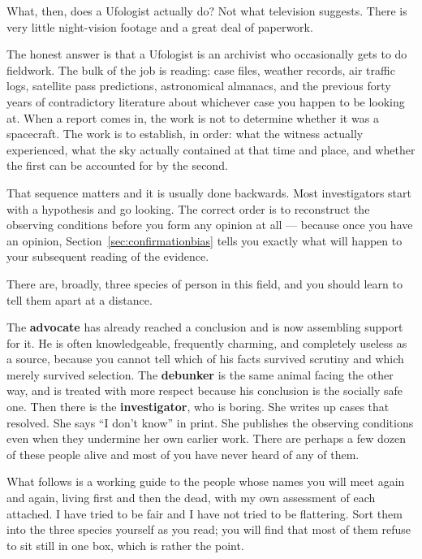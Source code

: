 What, then, does a Ufologist actually do? Not what television suggests. There is very
little night-vision footage and a great deal of paperwork.

The honest answer is that a Ufologist is an archivist who occasionally gets to do
fieldwork. The bulk of the job is reading: case files, weather records, air traffic
logs, satellite pass predictions, astronomical almanacs, and the previous forty years of
contradictory literature about whichever case you happen to be looking at. When a report
comes in, the work is not to determine whether it was a spacecraft. The work is to
establish, in order: what the witness actually experienced, what the sky actually
contained at that time and place, and whether the first can be accounted for by the
second.

That sequence matters and it is usually done backwards. Most investigators start with a
hypothesis and go looking. The correct order is to reconstruct the observing conditions
before you form any opinion at all --- because once you have an opinion, Section~\ref{sec:confirmationbias}
tells you exactly what will happen to your subsequent reading of the evidence.

There are, broadly, three species of person in this field, and you should learn to tell
them apart at a distance.

The \textbf{advocate} has already reached a conclusion and is now assembling support for
it. He is often knowledgeable, frequently charming, and completely useless as a source,
because you cannot tell which of his facts survived scrutiny and which merely survived
selection. The \textbf{debunker} is the same animal facing the other way, and is treated
with more respect because his conclusion is the socially safe one. Then there is the
\textbf{investigator}, who is boring. She writes up cases that resolved. She says ``I
don't know'' in print. She publishes the observing conditions even when they undermine
her own earlier work. There are perhaps a few dozen of these people alive and most of
you have never heard of any of them.

What follows is a working guide to the people whose names you will meet again and again,
living first and then the dead, with my own assessment of each attached. I have tried to
be fair and I have not tried to be flattering. Sort them into the three species yourself
as you read; you will find that most of them refuse to sit still in one box, which is
rather the point.

\ufobioportraits

